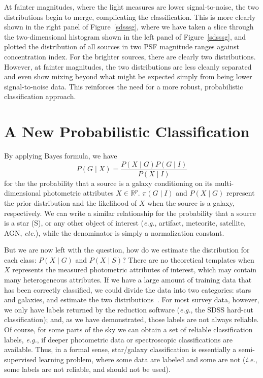 At fainter magnitudes, where the light measures are lower signal-to-noise, the two distributions begin to merge, complicating the classification. This is more clearly shown in the right panel of Figure~\ref{sdsssg}, where we have taken a slice through the two-dimensional histogram shown in the left panel of  Figure~\ref{sdsssg}, and plotted the distribution of all sources in two PSF magnitude ranges against concentration index. For the brighter sources, there are clearly two distributions. However, at fainter magnitudes, the two distributions are less cleanly separated and even show mixing beyond what might be expected simply from being lower signal-to-noise data. This reinforces the need for a more robust, probabilistic classification approach.

\section{A New Probabilistic Classification}

By applying Bayes formula, we have
\[ P(G \mid X) = \frac{P(X \mid G) P(G\mid I)}{P(X \mid I)}
\]
for the the probability that a source is a galaxy conditioning on its multi-dimensional photometric attributes $X \in \mathbb{R}^p$.  $\pi(G \mid I)$ and $P(X \mid G)$ represent the prior distribution and the likelihood of $X$ when the source is a galaxy, respectively. We can write a similar relationship for the probability that a source is a star (S), or any other object of interest (\textit{e.g.}, artifact, meteorite, satellite, AGN, \textit{etc.}), while the denominator is simply a normalization constant. %

But we are now left with the question, how do we estimate the distribution for each class: $P(X \mid G)$ and $P(X \mid S)$? There are no theoretical templates when $X$ represents the measured photometric attributes of interest, which may contain many heterogeneous attributes. If we have a large amount of training data that has been correctly classified, we could divide the data into two categories: stars and galaxies, and estimate the two distributions~\citep[\textit{e.g.},][]{fadely12}. For most survey data, however, we only have labels returned by the reduction software (\textit{e.g.}, the SDSS hard-cut classification); and, as we have demonstrated, those labels are not always reliable. Of course, for some parts of the sky we can obtain a set of reliable classification labels, \textit{e.g.}, if deeper photometric data or spectroscopic classifications are available. Thus, in a formal sense, star/galaxy classification  is essentially a semi-supervised learning problem, where some data  are labeled and some are not (\textit{i.e.}, some labels are not reliable, and should not be used). 

